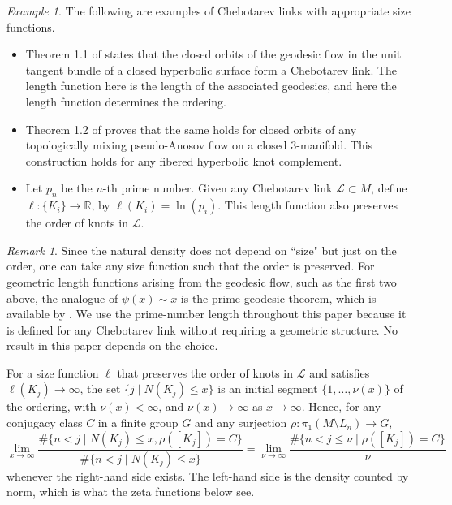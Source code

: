 \documentclass{amsart}
\theoremstyle{plain}
\theoremstyle{definition}
\theoremstyle{plain}
\theoremstyle{plain}
\theoremstyle{plain}
\theoremstyle{remark}
\newtheorem{remark}[theorem]{Remark}
\theoremstyle{remark}
\newtheorem{example}[theorem]{Example}
\theoremstyle{plain}
\theoremstyle{definition}
\theoremstyle{plain}
\theoremstyle{plain}
\theoremstyle{plain}
\numberwithin{equation}{section}
\begin{document}
\begin{example}
The following are examples of Chebotarev links with appropriate size functions.
\begin{itemize}
    \item Theorem 1.1 of \cite{mcmullen2013knots} states that the closed orbits of the geodesic flow in the unit tangent bundle of a closed hyperbolic surface form a Chebotarev link. The length function here is the length of the associated geodesics, and here the length function determines the ordering.
    \item Theorem 1.2 of \cite{mcmullen2013knots} proves that the same holds for closed orbits of any topologically mixing pseudo-Anosov flow on a closed 3-manifold. This construction holds for any fibered hyperbolic knot complement.
    \item Let $p_n$ be the $n$-th prime number. Given any Chebotarev link $\mathcal{L} \subset M$, define $\ell:\{K_i\} \rightarrow \mathbb{R}$, by $\ell(K_i) = \ln(p_i)$. This length function also preserves the order of knots in $\mathcal{L}$.
\end{itemize}
\end{example}

\begin{remark}
Since the natural density does not depend on ``size" but just on the order, one can take any size function such that the order is preserved. For geometric length functions arising from the geodesic flow, such as the first two above, the analogue of $\psi(x) \sim x$ is the prime geodesic theorem, which is available by \cite{parry1990zeta}. We use the prime-number length throughout this paper because it is defined for any Chebotarev link without requiring a geometric structure. No result in this paper depends on the choice.
\end{remark}

For a size function $\ell$ that preserves the order of knots in $\mathcal L$ and satisfies $\ell(K_j) \to \infty$, the set $\{j \mid N(K_j) \leq x\}$ is an initial segment $\{1, \dots, \nu(x)\}$ of the ordering, with $\nu(x) < \infty$, and $\nu(x) \to \infty$ as $x \to \infty$. Hence, for any conjugacy class $C$ in a finite group $G$ and any surjection $\rho: \pi_1(M \setminus L_n) \to G$,
\begin{equation}
    \lim_{x \to \infty}\frac{\#\{n < j \mid N(K_j) \leq x, \rho([K_j]) = C\}}{\#\{n < j \mid N(K_j) \leq x\}} = \lim_{\nu \to \infty}\frac{\#\{n < j \leq \nu \mid \rho([K_j]) = C\}}{\nu}
\end{equation}
whenever the right-hand side exists. The left-hand side is the density counted by norm, which is what the zeta functions below see.
\end{document}
